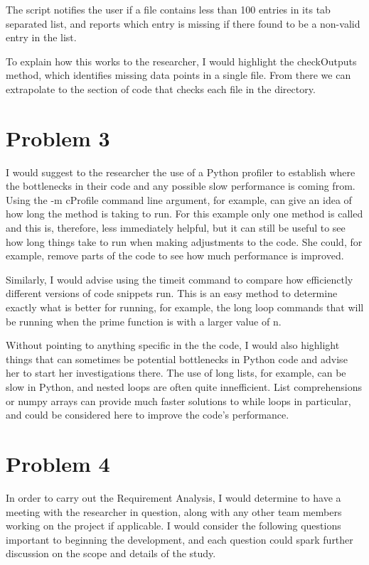 \documentclass{article}
\begin{document}
The script notifies the user if a file contains less than 100 entries in its tab separated list, and reports which entry is missing if there found to be a non-valid entry in the list.

To explain how this works to the researcher, I would highlight the checkOutputs method, which identifies missing data points in a single file.
From there we can extrapolate to the section of code that checks each file in the directory.

\section*{Problem 3}

I would suggest to the researcher the use of a Python profiler to establish where the bottlenecks in their code and any possible slow performance is coming from.
Using the -m cProfile command line argument, for example, can give an idea of how long the method is taking to run.
For this example only one method is called and this is, therefore, less immediately helpful, but it can still be useful to see how long things take to run when making adjustments to the code.
She could, for example, remove parts of the code to see how much performance is improved.

Similarly, I would advise using the timeit command to compare how efficienctly different versions of code snippets run.
This is an easy method to determine exactly what is better for running, for example, the long loop commands that will be running when the prime function is with a larger value of n.

Without pointing to anything specific in the the code, I would also highlight things that can sometimes be potential bottlenecks in Python code and advise her to start her investigations there.
The use of long lists, for example, can be slow in Python, and nested loops are often quite innefficient.
List comprehensions or numpy arrays can provide much faster solutions to while loops in particular, and could be considered here to improve the code's performance.

\section*{Problem 4}

In order to carry out the Requirement Analysis, I would determine to have a meeting with the researcher in question, along with any other team members working on the project if applicable.
I would consider the following questions important to beginning the development, and each question could spark further discussion on the scope and details of the study.
\end{document}
